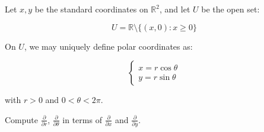 \documentclass[10pt]{article}
\newenvironment{problem}[2][]{\begin{trivlist}
\item[\hskip \labelsep {\bfseries #1}\hskip \labelsep {\bfseries #2.}]}{\end{trivlist}}
\begin{document}
\begin{problem}{Question 3}

Let $x,y$ be the standard coordinates on $\mathbb{R}^2$, and let $U$ be the open set:

$$ U = \mathbb{R} \setminus \{ (x,0) : x \geq 0  \}$$

On $U$, we may uniquely define polar coordinates as:

$$ \begin{cases} x = r \cos \theta \\ y = r \sin \theta \end{cases} $$

with $r > 0$ and $0 < \theta < 2\pi$.

Compute $\frac{\partial}{\partial r}$, $\frac{\partial}{\partial \theta}$ in terms of $\frac{\partial}{\partial x}$ and $\frac{\partial}{\partial y}$.

\end{problem}
\end{document}
